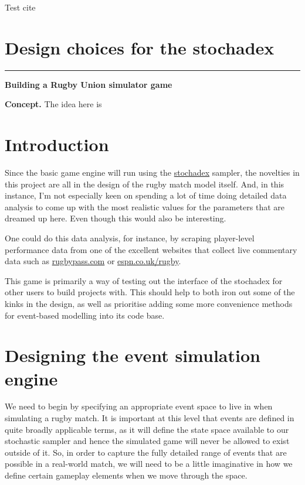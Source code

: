 \documentclass[sts]{imsart}
\begin{document}
Test cite~\cite{Dimastrogiovanni:2018xnn}

\section*{Design choices for the stochadex}


\newpage
{\color{gray75} {\Huge \bfseries{}} \hspace*{0.2em} \rule[-0.5ex]{0.3ex}{2.0em}} \hspace*{0.2em} {\Huge \bfseries\sffamily Building a Rugby Union simulator game}

\vspace*{1cm}
{\bfseries\sffamily Concept.} The idea here is 

\vspace*{1cm}
\section*{Introduction}

Since the basic game engine will run using the \href{https://github.com/umbralcalc/stochadex}{stochadex} sampler, the novelties in this project are all in the design of the rugby match model itself. And, in this instance, I'm not especially keen on spending a lot of time doing detailed data analysis to come up with the most realistic values for the parameters that are dreamed up here. Even though this would also be interesting.

One could do this data analysis, for instance, by scraping player-level performance data from one of the excellent websites that collect live commentary data such as \href{https://www.rugbypass.com/}{rugbypass.com} or \href{https://www.espn.co.uk/rugby/}{espn.co.uk/rugby}.

This game is primarily a way of testing out the interface of the stochadex for other users to build projects with. This should help to both iron out some of the kinks in the design, as well as prioritise adding some more convenience methods for event-based modelling into its code base.

\section*{Designing the event simulation engine}

We need to begin by specifying an appropriate event space to live in when simulating a rugby match. It is important at this level that events are defined in quite broadly applicable terms, as it will define the state space available to our stochastic sampler and hence the simulated game will never be allowed to exist outside of it. So, in order to capture the fully detailed range of events that are possible in a real-world match, we will need to be a little imaginative in how we define certain gameplay elements when we move through the space.
\end{document}

